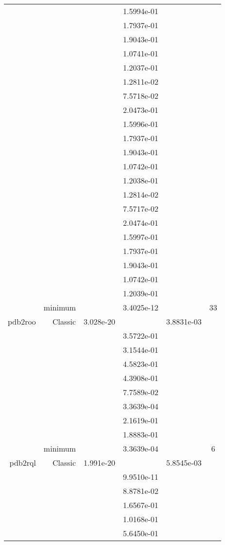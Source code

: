 \begin{xltabular}{\textwidth}{r|rS[table-format=1.3e+2]S[table-format=1.4e+2]S[table-format=1.4e+2]S[table-format=-1.5]}
&  &  & 1.5994e-01 & & \\
&  &  & 1.7937e-01 & & \\
&  &  & 1.9043e-01 & & \\
&  &  & 1.0741e-01 & & \\
&  &  & 1.2037e-01 & & \\
&  &  & 1.2811e-02 & & \\
&  &  & 7.5718e-02 & & \\
&  &  & 2.0473e-01 & & \\
&  &  & 1.5996e-01 & & \\
&  &  & 1.7937e-01 & & \\
&  &  & 1.9043e-01 & & \\
&  &  & 1.0742e-01 & & \\
&  &  & 1.2038e-01 & & \\
&  &  & 1.2814e-02 & & \\
&  &  & 7.5717e-02 & & \\
&  &  & 2.0474e-01 & & \\
&  &  & 1.5997e-01 & & \\
&  &  & 1.7937e-01 & & \\
&  &  & 1.9043e-01 & & \\
&  &  & 1.0742e-01 & & \\
&  &  & 1.2039e-01 & & \\
& minimum &  & 3.4025e-12 & & 33 \\  \addlinespace
pdb2roo & Classic & 3.028e-20 &  & 3.8831e-03 & \\
&  &  & 3.5722e-01 & & \\
&  &  & 3.1544e-01 & & \\
&  &  & 4.5823e-01 & & \\
&  &  & 4.3908e-01 & & \\
&  &  & 7.7589e-02 & & \\
&  &  & 3.3639e-04 & & \\
&  &  & 2.1619e-01 & & \\
&  &  & 1.8883e-01 & & \\
& minimum &  & 3.3639e-04 & & 6 \\  \addlinespace
pdb2rql & Classic & 1.991e-20 &  & 5.8545e-03 & \\
&  &  & 9.9510e-11 & & \\
&  &  & 8.8781e-02 & & \\
&  &  & 1.6567e-01 & & \\
&  &  & 1.0168e-01 & & \\
&  &  & 5.6450e-01 & & \\

\end{xltabular}
